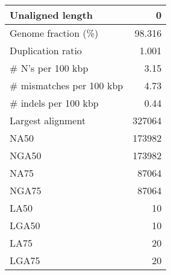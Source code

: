 \documentclass[12pt,a4paper]{article}
\begin{document}
\begin{table}[ht]
\begin{center}
\begin{tabular}{|l*{1}{|r}|}
Unaligned length & 0 \\ \hline
Genome fraction (\%) & 98.316 \\ \hline
Duplication ratio & 1.001 \\ \hline
\# N's per 100 kbp & 3.15 \\ \hline
\# mismatches per 100 kbp & 4.73 \\ \hline
\# indels per 100 kbp & 0.44 \\ \hline
Largest alignment & 327064 \\ \hline
NA50 & 173982 \\ \hline
NGA50 & 173982 \\ \hline
NA75 & 87064 \\ \hline
NGA75 & 87064 \\ \hline
LA50 & 10 \\ \hline
LGA50 & 10 \\ \hline
LA75 & 20 \\ \hline
LGA75 & 20 \\ \hline
\end{tabular}
\end{center}
\end{table}
\end{document}
